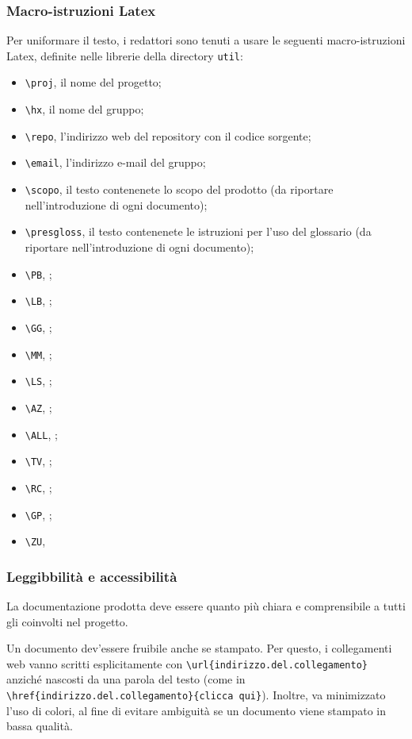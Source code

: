 \subsubsection{Macro-istruzioni Latex}
Per uniformare il testo, i redattori sono tenuti a usare le seguenti macro-istruzioni Latex, definite nelle librerie della directory \texttt{util}:
\begin{itemize}
	\item \texttt{\textbackslash proj}, il nome del progetto;
	\item \texttt{\textbackslash hx}, il nome del gruppo;
	\item \texttt{\textbackslash repo}, l'indirizzo web del repository con il codice sorgente;
	\item \texttt{\textbackslash email}, l'indirizzo e-mail del gruppo;
	\item \texttt{\textbackslash scopo}, il testo contenenete lo scopo del prodotto (da riportare nell'introduzione di ogni documento);
	\item \texttt{\textbackslash presgloss}, il testo contenenete le istruzioni per l'uso del glossario (da riportare nell'introduzione di ogni documento);
	\item \texttt{\textbackslash PB}, \PB;
	\item \texttt{\textbackslash LB}, \LB;
	\item \texttt{\textbackslash GG}, \GG;
	\item \texttt{\textbackslash MM}, \MM;
	\item \texttt{\textbackslash LS}, \LS;
	\item \texttt{\textbackslash AZ}, \AZ;
	\item \texttt{\textbackslash ALL}, \ALL;
	\item \texttt{\textbackslash TV}, \TV;
	\item \texttt{\textbackslash RC}, \RC;
	\item \texttt{\textbackslash GP}, \GP;
	\item \texttt{\textbackslash ZU}, \ZU
\end{itemize}

\subsubsection{Leggibbilità e accessibilità} \label{sec:leggibil}
La documentazione prodotta deve essere quanto più chiara e comprensibile a tutti gli  coinvolti nel progetto.

Un documento dev'essere fruibile anche se stampato. Per questo, i collegamenti web vanno scritti esplicitamente con \texttt{\textbackslash url\{indirizzo.del.collegamento\}} anziché nascosti da una parola del testo (come in \texttt{\textbackslash href\{indirizzo.del.collegamento\}\{clicca qui\}}). Inoltre, va minimizzato l'uso di colori, al fine di evitare ambiguità se un documento viene stampato in bassa qualità.



